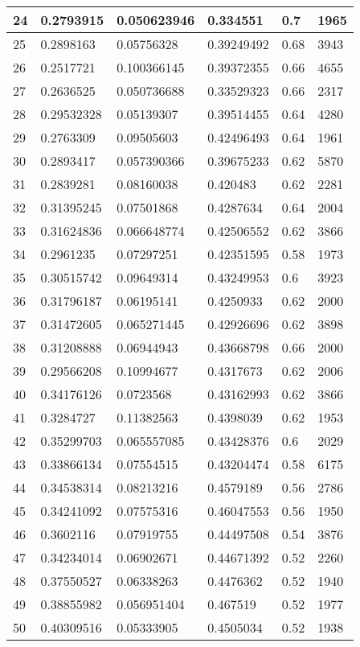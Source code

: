 \begin{longtable}{|l|l|l|l|l|l|}
24 & 0.2793915 & 0.050623946 & 0.334551 & 0.7 & 1965 \\ \hline 
25 & 0.2898163 & 0.05756328 & 0.39249492 & 0.68 & 3943 \\ \hline 
26 & 0.2517721 & 0.100366145 & 0.39372355 & 0.66 & 4655 \\ \hline 
27 & 0.2636525 & 0.050736688 & 0.33529323 & 0.66 & 2317 \\ \hline 
28 & 0.29532328 & 0.05139307 & 0.39514455 & 0.64 & 4280 \\ \hline 
29 & 0.2763309 & 0.09505603 & 0.42496493 & 0.64 & 1961 \\ \hline 
30 & 0.2893417 & 0.057390366 & 0.39675233 & 0.62 & 5870 \\ \hline 
31 & 0.2839281 & 0.08160038 & 0.420483 & 0.62 & 2281 \\ \hline 
32 & 0.31395245 & 0.07501868 & 0.4287634 & 0.64 & 2004 \\ \hline 
33 & 0.31624836 & 0.066648774 & 0.42506552 & 0.62 & 3866 \\ \hline 
34 & 0.2961235 & 0.07297251 & 0.42351595 & 0.58 & 1973 \\ \hline 
35 & 0.30515742 & 0.09649314 & 0.43249953 & 0.6 & 3923 \\ \hline 
36 & 0.31796187 & 0.06195141 & 0.4250933 & 0.62 & 2000 \\ \hline 
37 & 0.31472605 & 0.065271445 & 0.42926696 & 0.62 & 3898 \\ \hline 
38 & 0.31208888 & 0.06944943 & 0.43668798 & 0.66 & 2000 \\ \hline 
39 & 0.29566208 & 0.10994677 & 0.4317673 & 0.62 & 2006 \\ \hline 
40 & 0.34176126 & 0.0723568 & 0.43162993 & 0.62 & 3866 \\ \hline 
41 & 0.3284727 & 0.11382563 & 0.4398039 & 0.62 & 1953 \\ \hline 
42 & 0.35299703 & 0.065557085 & 0.43428376 & 0.6 & 2029 \\ \hline 
43 & 0.33866134 & 0.07554515 & 0.43204474 & 0.58 & 6175 \\ \hline 
44 & 0.34538314 & 0.08213216 & 0.4579189 & 0.56 & 2786 \\ \hline 
45 & 0.34241092 & 0.07575316 & 0.46047553 & 0.56 & 1950 \\ \hline 
46 & 0.3602116 & 0.07919755 & 0.44497508 & 0.54 & 3876 \\ \hline 
47 & 0.34234014 & 0.06902671 & 0.44671392 & 0.52 & 2260 \\ \hline 
48 & 0.37550527 & 0.06338263 & 0.4476362 & 0.52 & 1940 \\ \hline 
49 & 0.38855982 & 0.056951404 & 0.467519 & 0.52 & 1977 \\ \hline 
50 & 0.40309516 & 0.05333905 & 0.4505034 & 0.52 & 1938 \\ \hline 
\end{longtable}
